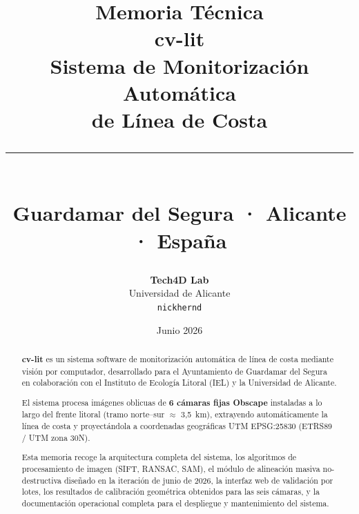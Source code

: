 \documentclass[12pt,a4paper,spanish]{report}
\title{%
  \vspace{-1.5cm}
  \textbf{\Huge Memoria Técnica}\\[0.4cm]
  {\Large\textcolor{NavyBlue}{cv-lit}}\\[0.2cm]
  {\large Sistema de Monitorización Automática}\\
  {\large de Línea de Costa}\\[0.6cm]
  \rule{\linewidth}{1pt}\\[0.4cm]
  {\normalsize Guardamar del Segura · Alicante · España}
}
\author{
  \textbf{Tech4D Lab}\\
  Universidad de Alicante\\
  \texttt{nickhernd}
}
\date{Junio 2026}
\begin{document}

\maketitle
\thispagestyle{empty}

\begin{abstract}
\noindent
\textbf{cv-lit} es un sistema software de monitorización automática de línea de costa mediante
visión por computador, desarrollado para el Ayuntamiento de Guardamar del Segura
en colaboración con el Instituto de Ecología Litoral (IEL) y la Universidad de Alicante.

El sistema procesa imágenes oblicuas de \textbf{6 cámaras fijas Obscape} instaladas a lo largo del
frente litoral (tramo norte--sur $\approx$ 3,5~km), extrayendo automáticamente la línea de costa
y proyectándola a coordenadas geográficas UTM EPSG:25830 (ETRS89 / UTM zona 30N).

Esta memoria recoge la arquitectura completa del sistema, los algoritmos de procesamiento
de imagen (SIFT, RANSAC, SAM), el módulo de alineación masiva no-destructiva diseñado en la
iteración de junio de 2026, la interfaz web de validación por lotes, los resultados de
calibración geométrica obtenidos para las seis cámaras, y la documentación operacional
completa para el despliegue y mantenimiento del sistema.
\end{abstract}

\tableofcontents
\listoffigures
\listoftables



















\end{document}
